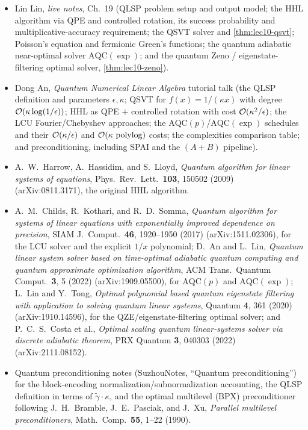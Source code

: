 \readingsection
\begin{itemize}[leftmargin=1.4em]
  \item Lin Lin, \emph{live notes}, Ch.~19 (QLSP problem setup and output model; the HHL
        algorithm via QPE and controlled rotation, its success probability and
        multiplicative-accuracy requirement; the QSVT solver and
        \cref{thm:lec10-qsvt}; Poisson's equation and fermionic Green's functions; the
        quantum adiabatic near-optimal solver $\mathrm{AQC}(\exp)$; and the quantum Zeno
        / eigenstate-filtering optimal solver, \cref{thm:lec10-zeno}).
  \item Dong An, \emph{Quantum Numerical Linear Algebra} tutorial talk (the QLSP
        definition and parameters $\epsilon,\kappa$; QSVT for $f(x)=1/(\kappa x)$ with
        degree $\mathcal{O}(\kappa\log(1/\epsilon))$; HHL as QPE $+$ controlled rotation with
        cost $\mathcal{O}(\kappa^2/\epsilon)$; the LCU Fourier/Chebyshev approaches; the
        $\mathrm{AQC}(p)$/$\mathrm{AQC}(\exp)$ schedules and their
        $\mathcal{O}(\kappa/\epsilon)$ and $\mathcal{O}(\kappa\,\operatorname{polylog})$ costs; the complexities
        comparison table; and preconditioning, including SPAI and the $(A+B)$ pipeline).
  \item A.~W.~Harrow, A.~Hassidim, and S.~Lloyd, \emph{Quantum algorithm for linear
        systems of equations}, Phys.\ Rev.\ Lett.\ \textbf{103}, 150502 (2009)
        (arXiv:0811.3171), the original HHL algorithm.
  \item A.~M.~Childs, R.~Kothari, and R.~D.~Somma, \emph{Quantum algorithm for systems
        of linear equations with exponentially improved dependence on precision}, SIAM
        J.\ Comput.\ \textbf{46}, 1920--1950 (2017) (arXiv:1511.02306), for the LCU
        solver and the explicit $1/x$ polynomial; D.~An and L.~Lin, \emph{Quantum linear
        system solver based on time-optimal adiabatic quantum computing and quantum
        approximate optimization algorithm}, ACM Trans.\ Quantum Comput.\ \textbf{3}, 5
        (2022) (arXiv:1909.05500), for $\mathrm{AQC}(p)$ and $\mathrm{AQC}(\exp)$;
        L.~Lin and Y.~Tong, \emph{Optimal polynomial based quantum eigenstate filtering
        with application to solving quantum linear systems}, Quantum \textbf{4}, 361
        (2020) (arXiv:1910.14596), for the QZE/eigenstate-filtering optimal solver; and
        P.~C.~S.~Costa et al., \emph{Optimal scaling quantum linear-systems solver via
        discrete adiabatic theorem}, PRX Quantum \textbf{3}, 040303 (2022)
        (arXiv:2111.08152).
  \item Quantum preconditioning notes (SuzhouNotes, ``Quantum preconditioning'') for the
        block-encoding normalization/subnormalization accounting, the QLSP definition in
        terms of $\tilde\gamma\cdot\kappa$, and the optimal multilevel (BPX)
        preconditioner following J.~H.~Bramble, J.~E.~Pasciak, and J.~Xu,
        \emph{Parallel multilevel preconditioners}, Math.\ Comp.\ \textbf{55}, 1--22
        (1990).
\end{itemize}
